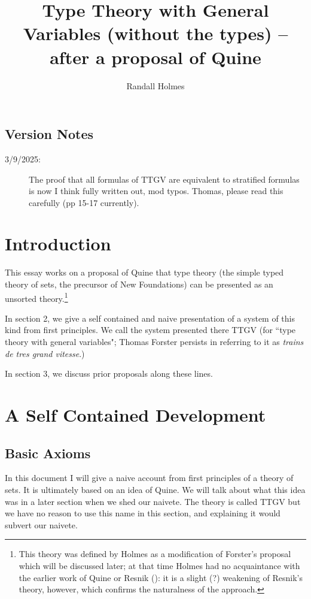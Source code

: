 \documentclass[12pt]{article}
\title{Type Theory with General Variables (without the types) -- after a proposal of Quine}
\author{Randall Holmes}
\begin{document}
\maketitle

\subsection{Version Notes}

\begin{description}

\item[3/9/2025:]  The proof that all formulas of TTGV are equivalent to stratified formulas is now I think fully written out, mod typos.  Thomas, please read this carefully (pp 15-17 currently).

\end{description}

\section{Introduction}

This essay works on a proposal of Quine that type theory (the simple typed theory of sets, the precursor of New Foundations) can be presented as an unsorted theory.\footnote{This theory was defined by Holmes as a modification of Forster's proposal which will be discussed later; at that time Holmes had no acquaintance with the earlier work of Quine or Resnik (\cite{resnikttgv}):  it is a slight (?) weakening of Resnik's theory, however, which confirms the naturalness of the approach.}

In section 2, we give a self contained and naive presentation of a system of this kind from first principles.  We call the system presented there TTGV (for ``type theory with general variables";  Thomas Forster persists in referring to it as {\em trains de tres grand vitesse\/}.)

In section 3, we discuss prior proposals along these lines.

\section{A Self Contained Development}

\subsection{Basic Axioms}

In this document I will give a naive account from first principles of a theory of sets.  It is ultimately based on an idea of Quine.  We will talk about what this idea was in a later section when we shed our naivete.  The theory is called TTGV but we have no reason to use this name in this section, and explaining it would subvert our naivete.
\end{document}
